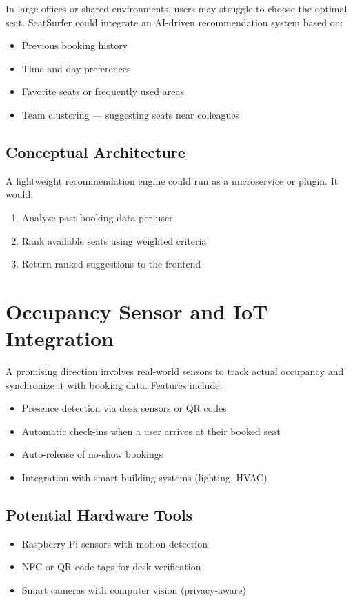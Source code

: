 \documentclass[12pt,a4paper]{report}
\begin{document}
In large offices or shared environments, users may struggle to choose the optimal seat. SeatSurfer could integrate an AI-driven recommendation system based on:
\begin{itemize}
    \item Previous booking history
    \item Time and day preferences
    \item Favorite seats or frequently used areas
    \item Team clustering — suggesting seats near colleagues
\end{itemize}

\subsection*{Conceptual Architecture}

A lightweight recommendation engine could run as a microservice or plugin. It would:
\begin{enumerate}
    \item Analyze past booking data per user
    \item Rank available seats using weighted criteria
    \item Return ranked suggestions to the frontend
\end{enumerate}

\section{Occupancy Sensor and IoT Integration}

A promising direction involves real-world sensors to track actual occupancy and synchronize it with booking data. Features include:

\begin{itemize}
    \item Presence detection via desk sensors or QR codes
    \item Automatic check-ins when a user arrives at their booked seat
    \item Auto-release of no-show bookings
    \item Integration with smart building systems (lighting, HVAC)
\end{itemize}

\subsection*{Potential Hardware Tools}
\begin{itemize}
    \item Raspberry Pi sensors with motion detection
    \item NFC or QR-code tags for desk verification
    \item Smart cameras with computer vision (privacy-aware)
\end{itemize}
\end{document}
